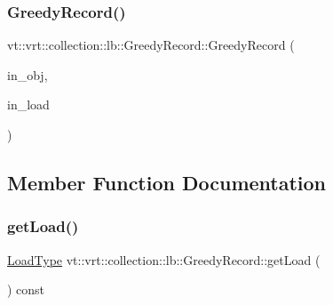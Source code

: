 \subsubsection{\texorpdfstring{Greedy\+Record()}{GreedyRecord()}}
{\footnotesize\ttfamily vt\+::vrt\+::collection\+::lb\+::\+Greedy\+Record\+::\+Greedy\+Record (\begin{DoxyParamCaption}\item[{\hyperlink{structvt_1_1vrt_1_1collection_1_1lb_1_1_greedy_record_a6b0754b2434fca9e865fa8422e3d709e}{Obj\+Type} const \&}]{in\+\_\+obj,  }\item[{\hyperlink{structvt_1_1vrt_1_1collection_1_1lb_1_1_greedy_record_a3ac0f749c48eb624837eda5bca988845}{Load\+Type} const \&}]{in\+\_\+load }\end{DoxyParamCaption})\hspace{0.3cm}{\ttfamily [inline]}}



\subsection{Member Function Documentation}
\mbox{\label{structvt_1_1vrt_1_1collection_1_1lb_1_1_greedy_record_a9002f1d8f851ec77bf3bb78d75932cb5}} 
\subsubsection{\texorpdfstring{get\+Load()}{getLoad()}}
{\footnotesize\ttfamily \hyperlink{structvt_1_1vrt_1_1collection_1_1lb_1_1_greedy_record_a3ac0f749c48eb624837eda5bca988845}{Load\+Type} vt\+::vrt\+::collection\+::lb\+::\+Greedy\+Record\+::get\+Load (\begin{DoxyParamCaption}{ }\end{DoxyParamCaption}) const\hspace{0.3cm}{\ttfamily [inline]}}

\mbox{\label{structvt_1_1vrt_1_1collection_1_1lb_1_1_greedy_record_a5f7a3e144c43f74c587ff054af1e267f}} 
